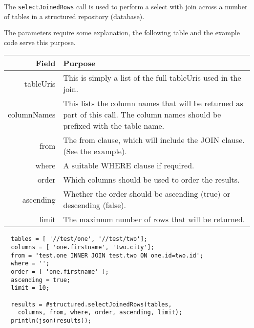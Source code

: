 The \verb+selectJoinedRows+ call is used to perform a select with join across a number of tables in a
structured repository (database).

The parameters require some explanation, the following table and the example code serve this purpose.

\begin{table}[H]
\begin{center}
\begin{tabular}{r p{10cm}}
  Field & Purpose \\
  \hline
  tableUris & This is simply a list of the full tableUris used in the join. \\
  columnNames & This lists the column names that will be returned as part of this call. The column names should be prefixed with the table name. \\
  from & The from clause, which will include the JOIN clause. (See the example). \\
  where & A suitable WHERE clause if required. \\
  order & Which columns should be used to order the results. \\
  ascending & Whether the order should be ascending (true) or descending (false). \\
  limit & The maximum number of rows that will be returned. \\
\end{tabular}
\end{center}
\end{table}

\begin{Verbatim}
  tables = [ '//test/one', '//test/two'];
  columns = [ 'one.firstname', 'two.city'];
  from = 'test.one INNER JOIN test.two ON one.id=two.id';
  where = '';
  order = [ 'one.firstname' ];
  ascending = true;
  limit = 10;

  results = #structured.selectJoinedRows(tables,
    columns, from, where, order, ascending, limit);
  println(json(results));
\end{Verbatim}
